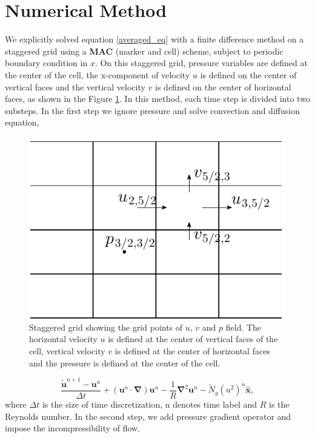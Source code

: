 \documentclass[12pt]{report}   %
\newcommand{\bx}{{\boldsymbol{\hat{x}}}}
\newcommand{\bu}{\mathbf{u}}
\newcommand{\grad}{\mathbf{\nabla}}
\newcommand{\Ndg}{\tilde{N}_g}
\begin{document}
\section{Numerical Method}
We explicitly solved equation
\eqref{averaged_eq} with a finite difference method on a staggered grid using a {\bf{MAC}} (marker and cell) scheme, subject to periodic boundary condition in $x$. On this staggered grid, pressure variables are defined at the center of the cell, the x-component of velocity $u$ is defined on the center of vertical faces and the vertical velocity $v$ is defined on the center of horizontal faces, as shown in the Figure \ref{staggered}.
In this method, each time step is divided into two substeps. In the first step we ignore pressure and solve convection and diffusion equation,
\begin{figure}
\centerline{\includegraphics{StaggardGrid}}
\caption[Staggered grid showing the grid points of $u$, $v$ and $p$ field.]{Staggered grid showing the grid points of $u$, $v$ and $p$ field. The horizontal velocity $u$ is defined at the center of vertical faces of the cell, vertical velocity $v$ is defined at the center of horizontal faces and the pressure is defined at the center of the cell.   }
\label{staggered}
\end{figure}
\begin{equation}
\frac{\tilde{\bu}^{n+1}-\bu^{n}}{\Delta t}+(\bu^n \cdot \grad )\bu^n - \frac{1}{R} \grad^2 \bu^n -\Ndg (u^2)^n\bx,
\label{TransportEq}
\end{equation}
where $\Delta t$ is the size of time discretization, n denotes time label and $R$ is the Reynolds number. In the second step, we add pressure gradient operator and impose the incompressibility of flow.
\end{document}
